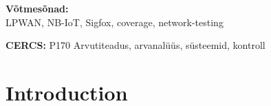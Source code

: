 \documentclass[12pt]{article}
\newcommand{\TODO}{\todo[inline]}
\begin{document}
{{\vspace*{1ex}

\noindent\textbf{Võtmesõnad:}\\
LPWAN, NB-IoT, Sigfox, coverage, network-testing 

\vspace*{1ex}

\noindent\textbf{CERCS:} P170 Arvutiteadus, arvanalüüs, süsteemid, kontroll

\vspace*{1ex}
}}%




\newpage
\tableofcontents
\hypersetup{hidelinks}
\newpage

\listoffigures
\listoftables
\newpage




\newpage
\section{Introduction}
\end{document}
